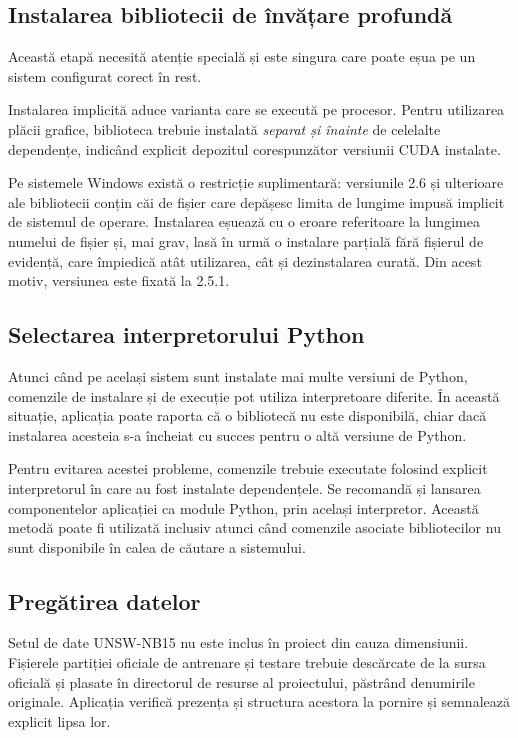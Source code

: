 \subsection{Instalarea bibliotecii de învățare profundă}\label{subsec:torch}

Această etapă necesită atenție specială și este singura care poate eșua pe un sistem configurat corect în rest.

Instalarea implicită aduce varianta care se execută pe procesor. Pentru utilizarea plăcii grafice, biblioteca trebuie instalată \emph{separat și înainte} de celelalte dependențe, indicând explicit depozitul corespunzător versiunii CUDA instalate.

Pe sistemele Windows există o restricție suplimentară: versiunile 2.6 și ulterioare ale bibliotecii conțin căi de fișier care depășesc limita de lungime impusă implicit de sistemul de operare. Instalarea eșuează cu o eroare referitoare la lungimea numelui de fișier și, mai grav, lasă în urmă o instalare parțială fără fișierul de evidență, care împiedică atât utilizarea, cât și dezinstalarea curată. Din acest motiv, versiunea este fixată la 2.5.1.

\subsection{Selectarea interpretorului Python}
\label{subsec:doua-python}

Atunci când pe același sistem sunt instalate mai multe versiuni de Python, comenzile de instalare și de execuție pot utiliza interpretoare diferite. În această situație, aplicația poate raporta că o bibliotecă nu este disponibilă, chiar dacă instalarea acesteia s-a încheiat cu succes pentru o altă versiune de Python.

Pentru evitarea acestei probleme, comenzile trebuie executate folosind explicit interpretorul în care au fost instalate dependențele. Se recomandă și lansarea componentelor aplicației ca module Python, prin același interpretor. Această metodă poate fi utilizată inclusiv atunci când comenzile asociate bibliotecilor nu sunt disponibile în calea de căutare a sistemului.

\subsection{Pregătirea datelor}\label{subsec:date-instalare}

Setul de date UNSW-NB15 nu este inclus în proiect din cauza dimensiunii. Fișierele partiției oficiale de antrenare și testare trebuie descărcate de la sursa oficială și plasate în directorul de resurse al proiectului, păstrând denumirile originale. Aplicația verifică prezența și structura acestora la pornire și semnalează explicit lipsa lor.

